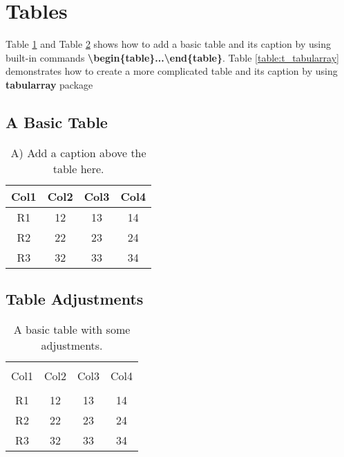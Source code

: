 \documentclass[a4paper, 12pt]{article}
\begin{document}
	\setcounter{section}{6} %
	\section{Tables}
	Table \ref{table:t_basic1} and Table \ref{table:t_basic2} shows how to add a basic table and its caption by using built-in commands \textbf{\textbackslash begin\{table\}...\textbackslash end\{table\}}. Table \ref{table:t_tabularray} demonstrates how to create a more complicated table and its caption by using \textbf{tabularray} package
	
	\subsection{A Basic Table }
	\begin{table}[h!]
		\centering
		\caption{A) Add a caption above the table here.}
		\begin{tabular}	{| c | c | c | c |} 
			\hline
			Col1 & Col2 & Col3 	& Col4	\\
			\hline
			R1 	 & 12 	& 13 	& 14 	\\ 
			R2 	 & 22 	& 23 	& 24 	\\
			R3 	 & 32 	& 33 	& 34 	\\
			\hline
		\end{tabular}
		\label{table:t_basic1}
	\end{table}
	
	\subsection{Table Adjustments}
	\vspace{-0.9em} %
	\begin{table}[h!]
		\centering
		\caption{A basic table with some adjustments.}
		\vspace{0.5em} %
		\begin{tabular}	{| c | c  c | c |} 
			\hline
							 &		&		&	 	\\[-0.9em] %
						Col1 & Col2 & Col3 	& Col4	\\[0.1em]
			\hline
			\hline
							 &		&		&	 	\\[-0.9em]	%
						  R1 & 12 	& 13 	& 14 	\\ 
						  R2 & 22 	& 23 	& 24 	\\
						  R3 & 32 	& 33 	& 34 	\\[0.1em] 
			\hline
		\end{tabular}
		\label{table:t_basic2}
	\end{table}
	
\end{document}
